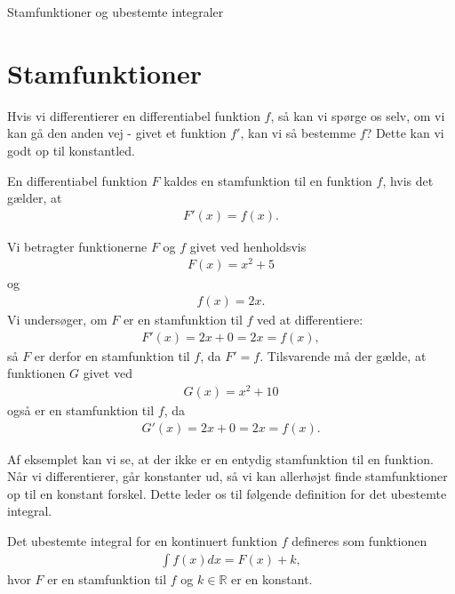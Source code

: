 \begin{center}
\Huge
Stamfunktioner og ubestemte integraler
\end{center}

\section*{Stamfunktioner}

Hvis vi differentierer en differentiabel funktion $f$, så kan vi spørge os selv, om vi kan gå den anden vej - givet et funktion $f'$, kan vi så bestemme $f$? Dette kan vi godt op til konstantled. 
\begin{defn}[Stamfunktion]
En differentiabel funktion $F$ kaldes en stamfunktion til en funktion $f$, hvis det gælder, at 
\begin{align*}
F'(x) = f(x).
\end{align*}
\end{defn}
\begin{exa}
	Vi betragter funktionerne $F$ og $f$ givet ved henholdsvis
	\begin{align*}
		F(x) = x^2 + 5
	\end{align*}
	og 
	\begin{align*}
		f(x) = 2x.
	\end{align*}
	Vi undersøger, om $F$ er en stamfunktion til $f$ ved at differentiere:
	\begin{align*}
		F'(x) = 2x + 0 = 2x = f(x),
	\end{align*}
	så $F$ er derfor en stamfunktion til $f$, da $F' = f$. 
	Tilsvarende må der gælde, at funktionen $G$ givet ved
	\begin{align*}
		G(x) = x^2 + 10
	\end{align*}
	også er en stamfunktion til $f$, da
	\begin{align*}
		G'(x) = 2x + 0 = 2x = f(x).
	\end{align*}
\end{exa}
Af eksemplet kan vi se, at der ikke er en entydig stamfunktion til en funktion. Når vi differentierer, går konstanter ud, så vi kan allerhøjst finde stamfunktioner op til en konstant forskel. Dette leder os til følgende definition for det
ubestemte integral.
\newpage
\begin{defn}
	Det ubestemte integral for en kontinuert funktion $f$ defineres som funktionen
	\begin{align*}
		\int f(x) dx = F(x) + k,
	\end{align*}
	hvor $F$ er en stamfunktion til $f$ og $k\in \mathbb{R}$ er en konstant.
\end{defn}
